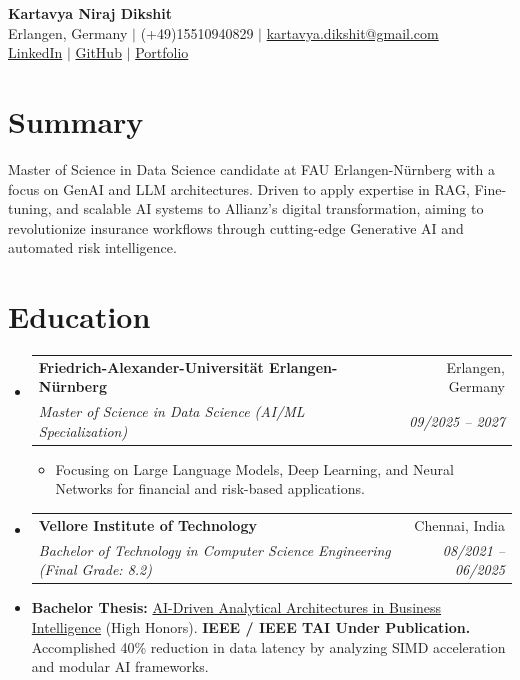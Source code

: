 \documentclass[10pt,a4paper]{article}
\makeatletter
\newcommand{\resumeItem}[1]{\item\small{#1}}
\newcommand{\resumeSubheading}[4]{
  \vspace{-1pt}\item
    \begin{tabular*}{1.0\textwidth}[t]{l@{\extracolsep{\fill}}r}
      \textbf{#1} & #2 \\
      \textit{\small#3} & \textit{\small #4} \\
    \end{tabular*}\vspace{-5pt}
}
\makeatother
\begin{document}
\begin{center}
    \textbf{\huge Kartavya Niraj Dikshit} \\ \vspace{4pt}
    \small Erlangen, Germany $|$ (+49)15510940829 $|$ \href{mailto:kartavya.dikshit@gmail.com}{kartavya.dikshit@gmail.com} \\
    \small \href{https://www.linkedin.com/in/kartavya-dikshit}{LinkedIn} $|$ \href{https://github.com/KartavyaDikshit}{GitHub} $|$ \href{https://kartavyadikshit.github.io/}{Portfolio}
\end{center}

\section{Summary}
Master of Science in Data Science candidate at FAU Erlangen-Nürnberg with a focus on GenAI and LLM architectures. Driven to apply expertise in RAG, Fine-tuning, and scalable AI systems to Allianz's digital transformation, aiming to revolutionize insurance workflows through cutting-edge Generative AI and automated risk intelligence.

\section{Education}
\begin{itemize}[label={}]
    \resumeSubheading
      {Friedrich-Alexander-Universität Erlangen-Nürnberg}{Erlangen, Germany}
      {Master of Science in Data Science (AI/ML Specialization)}{09/2025 -- 2027}
      \begin{itemize}
        \resumeItem{Focusing on Large Language Models, Deep Learning, and Neural Networks for financial and risk-based applications.}
      \end{itemize}
    \resumeSubheading
      {Vellore Institute of Technology}{Chennai, India}
      {Bachelor of Technology in Computer Science Engineering (Final Grade: 8.2)}{08/2021 -- 06/2025}
      \resumeItem{\textbf{Bachelor Thesis:} \href{http://datums.ai/}{AI-Driven Analytical Architectures in Business Intelligence} (High Honors). \textbf{IEEE / IEEE TAI Under Publication.} Accomplished 40\% reduction in data latency by analyzing SIMD acceleration and modular AI frameworks.}
\end{itemize}
\end{document}
